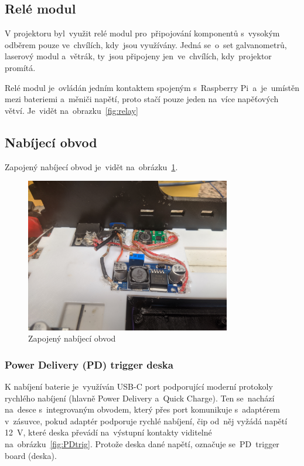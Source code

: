 \subsection{Relé modul}
V projektoru byl~využit relé modul pro~připojování komponentů s~vysokým odběrem pouze ve~chvílích, kdy~jsou využívány. Jedná se~o~set galvanometrů, laserový modul a~větrák, ty~jsou připojeny jen~ve~chvílích, kdy~projektor promítá.

Relé modul je~ovládán jedním kontaktem spojeným s~Raspberry Pi~a~je~umístěn mezi bateriemi a~měniči napětí, proto stačí pouze jeden na~více napěťových větví. Je~vidět na~obrazku~\ref{fig:relay}

\subsection{Nabíjecí obvod}
Zapojený nabíjecí obvod je~vidět na~obrázku~\ref{fig:hw_charging_circuit}.

\begin{figure}[htb]
  \centering
  \includegraphics[width=0.8\textwidth]{img/hw_charging_circuit.jpg}
  \caption{\label{fig:hw_charging_circuit} Zapojený nabíjecí obvod}
\end{figure}

\subsubsection{Power Delivery (PD) trigger deska}
K nabíjení baterie je~využíván USB-C port podporující moderní protokoly rychlého nabíjení (hlavně Power Delivery a~Quick Charge).
Ten se~nachází na~desce s~integrovaným obvodem, který přes port komunikuje s~adaptérem v~zásuvce, pokud adaptér podporuje rychlé nabíjení, čip od~něj vyžádá napětí 12~V, které deska převádí na~výstupní kontakty viditelné na~obrázku~\ref{fig:PDtrig}. Protože deska  dané napětí, označuje se~PD~trigger board (deska).

